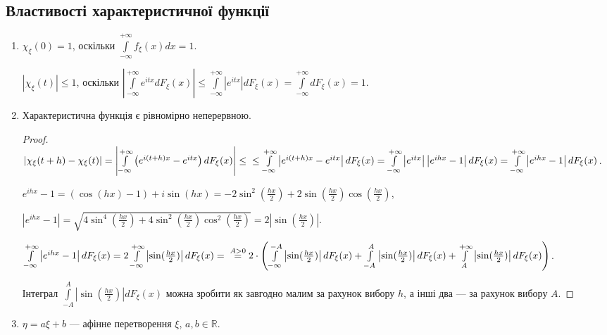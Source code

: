 \subsection{Властивості характеристичної функції}
\begin{enumerate}
    \item $\chi_\xi(0) = 1$, оскільки $\int\limits_{-\infty}^{+\infty} f_\xi(x)dx = 1$.
    
    $\left|\chi_\xi(t)\right| \leq 1$, оскільки $\left|\int\limits_{-\infty}^{+\infty} e^{itx} dF_\xi(x)\right| \leq \int\limits_{-\infty}^{+\infty} \left|e^{itx}\right| dF_\xi(x) = \int\limits_{-\infty}^{+\infty} dF_\xi(x) = 1$.
    \item Характеристична функція є рівномірно неперервною.
    \begin{proof}
        $\left| \chi_\xi(t+h) - \chi_\xi(t) \right| = 
        \left| \int\limits_{-\infty}^{+\infty} \left( e^{i(t+h)x} - e^{itx}\right) dF_\xi(x) \right| \leq \\
        \leq \int\limits_{-\infty}^{+\infty} \left|e^{i(t+h)x} - e^{itx}\right| dF_\xi(x) = 
        \int\limits_{-\infty}^{+\infty} \left|e^{itx}\right|\left| e^{ihx} - 1\right| dF_\xi(x) = 
        \int\limits_{-\infty}^{+\infty} \left|e^{ihx} - 1\right| dF_\xi(x)$.

        $e^{ihx} - 1 = (\cos(hx) - 1) + i\sin(hx) = -2\sin^2(\frac{hx}{2}) + 2\sin(\frac{hx}{2})\cos(\frac{hx}{2})$, 
        
        $\left| e^{ihx} - 1\right| = 
        \sqrt{4\sin^4(\frac{hx}{2}) + 4\sin^2(\frac{hx}{2})\cos^2(\frac{hx}{2})} = 2\left| \sin(\frac{hx}{2})\right|$.

        $\int\limits_{-\infty}^{+\infty} \left|e^{ihx} - 1\right| dF_\xi(x) = 2 \int\limits_{-\infty}^{+\infty} \left| \sin(\frac{hx}{2})\right| dF_\xi(x) =
        \\\overset{A>0}{=} 2\cdot \left( \int\limits_{-\infty}^{-A}\left| \sin(\frac{hx}{2})\right| dF_\xi(x) + 
        \int\limits_{-A}^{A}\left| \sin(\frac{hx}{2})\right| dF_\xi(x) + 
        \int\limits_{A}^{+\infty}\left| \sin(\frac{hx}{2})\right| dF_\xi(x)\right)
        $.

        Інтеграл $\int\limits_{-A}^{A}\left| \sin(\frac{hx}{2})\right| dF_\xi(x)$
        можна зробити як завгодно малим за рахунок вибору $h$,
        а інші два --- за рахунок вибору $A$.
    \end{proof}
    \item $\eta = a\xi + b$ --- афінне перетворення $\xi$, $a, b \in \mathbb{R}$.


\end{enumerate}

